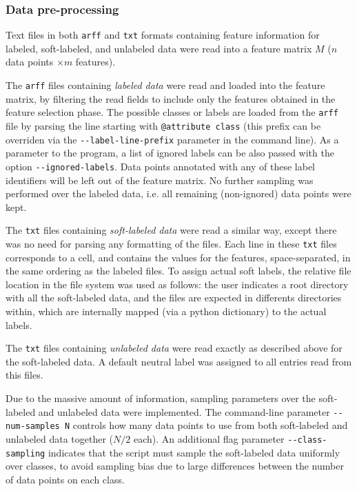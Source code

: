 \documentclass[oneside, a4paper, draft]{memoir} %
\begin{document}
\subsubsection{Data pre-processing}
Text files in both \texttt{arff} and \texttt{txt} formats containing feature information for labeled, soft-labeled,
and unlabeled data were read into a feature matrix $M$ ($n$ data points $\times m$ features).

The \texttt{arff} files containing \emph{labeled data} were read and loaded into the feature matrix, by filtering the
read fields to include only the features obtained in the feature selection phase. The possible classes or labels are
loaded from the \texttt{arf{}f} file by parsing the line starting with \texttt{@attribute class} (this prefix can be
overriden via the \texttt{-{}-label-line-prefix} parameter in the command line). As a parameter to the program, a list
of ignored labels can be also passed with the option \texttt{-{}-ignored-labels}. Data points annotated with any of
these label identifiers will be left out of the feature matrix. No further sampling was performed over the labeled
data, i.e. all remaining (non-ignored) data points were kept.

The \texttt{txt} files containing \emph{soft-labeled data} were read a similar way, except there was no need for
parsing any formatting of the files. Each line in these \texttt{txt} files corresponds to a cell, and contains the
values for the features, space-separated, in the same ordering as the labeled files. To assign actual soft labels, the
relative file location in the file system was used as follows: the user indicates a root directory with all the 
soft-labeled data, and the files are expected in differents directories within, which are internally mapped 
(via a python dictionary) to the actual labels.

The \texttt{txt} files containing \emph{unlabeled data} were read exactly as described above for the soft-labeled
data. A default neutral label was assigned to all entries read from this files.

Due to the massive amount of information, sampling parameters over the soft-labeled and unlabeled data were
implemented. The command-line parameter \texttt{-{}-num-samples N} controls how many data points to use from both
soft-labeled and unlabeled data together ($N/2$ each). An additional flag parameter \texttt{-{}-class-sampling}
indicates that the script must sample the soft-labeled data uniformly over classes, to avoid sampling bias due to
large differences between the number of data points on each class.
\end{document}
